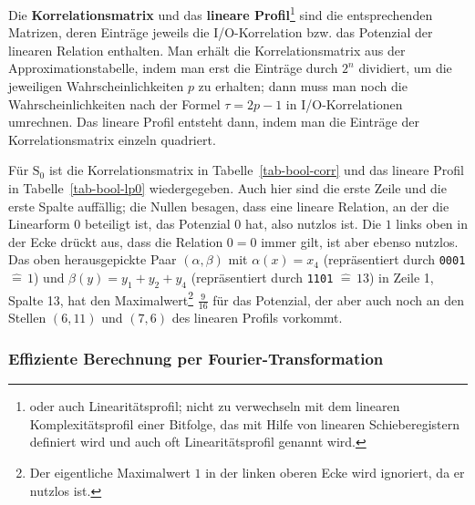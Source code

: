 \begin{refsegment}
Die {\bf Korrelationsmatrix} und das
{\bf lineare Profil}\footnote{%
   oder auch Linearitätsprofil; nicht zu verwechseln
   mit dem linearen
   Komplexitätsprofil einer
   Bitfolge, das mit Hilfe von linearen Schieberegistern
   definiert wird und auch oft Linearitätsprofil genannt wird.
   }
sind die entsprechenden Matrizen, deren Einträge
jeweils die I/O-Korrelation bzw. das
Potenzial der linearen Relation enthalten.
Man erhält die Korrelationsmatrix aus der
Approximationstabelle, indem man erst
die Einträge durch $2^n$ dividiert, um die jeweiligen Wahrscheinlichkeiten $p$
zu erhalten; dann muss man noch die Wahrscheinlichkeiten nach der Formel
$\tau = 2p - 1$ in I/O-Korrelationen umrechnen.
Das lineare Profil
entsteht dann, indem man die Einträge der
Korrelationsmatrix einzeln quadriert.

Für $\mathrm{S}_0$ ist die Korrelationsmatrix
in Tabelle~\ref{tab-bool-corr} und
das lineare Profil
in Tabelle~\ref{tab-bool-lp0} wiedergegeben. Auch hier sind
die erste Zeile und die erste Spalte auffällig; die Nullen besagen, dass
eine lineare Relation,
an der die Linearform $0$ beteiligt ist, das
Potenzial $0$ hat, also nutzlos ist. Die $1$ links oben in der Ecke
drückt aus, dass die Relation $0 = 0$ immer gilt, ist aber ebenso nutzlos.
Das oben herausgepickte
Paar $(\alpha,\beta)$ mit $\alpha(x) = x_4$ (repräsentiert durch \verb:0001: $\hat{=}\, 1$)
und $\beta(y) = y_1+y_2+y_4$ (repräsentiert durch \verb:1101: $\hat{=}\, 13$) in Zeile 1,
Spalte 13, hat den Maximalwert\footnote{%
  Der eigentliche Maximalwert $1$ in der linken oberen Ecke wird
  ignoriert, da er nutzlos ist.
} $\frac{9}{16}$ für das Potenzial, der aber auch noch
an den Stellen $(6,11)$ und $(7,6)$ des linearen Profils vorkommt.

\subsubsection*{Effiziente Berechnung per Fourier-Transformation}


\end{refsegment}
